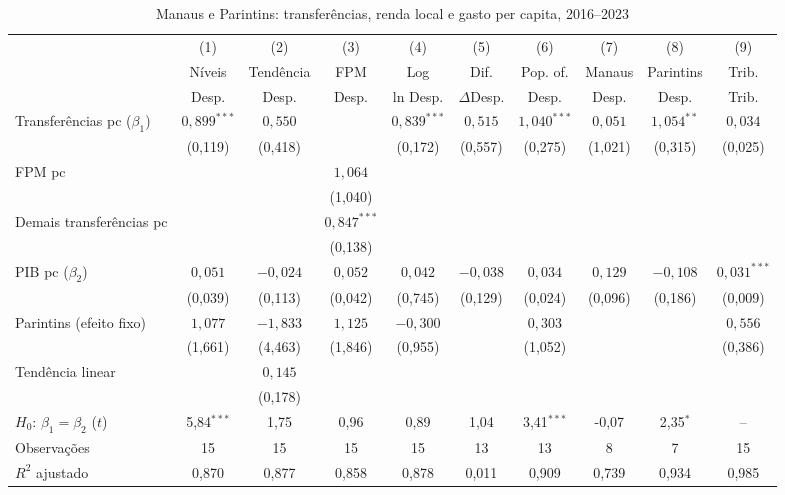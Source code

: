 \begin{table}[htbp]
\centering
\caption{Manaus e Parintins: transferências, renda local e gasto per capita, 2016--2023}
\label{tab:reg}
\scriptsize
\setlength{\tabcolsep}{2.6pt}
\begin{tabular}{lccccccccc}
\toprule
 & (1) & (2) & (3) & (4) & (5) & (6) & (7) & (8) & (9)\\
 & Níveis & Tendência & FPM & Log & Dif. & Pop. of. & Manaus & Parintins & Trib.\\
 & Desp. & Desp. & Desp. & ln Desp. & $\Delta$Desp. & Desp. & Desp. & Desp. & Trib.\\
\midrule
Transferências pc ($\beta_1$) & $0,899^{***}$ & $0,550$ &  & $0,839^{***}$ & $0,515$ & $1,040^{***}$ & $0,051$ & $1,054^{**}$ & $0,034$\\
 & (0,119) & (0,418) &  & (0,172) & (0,557) & (0,275) & (1,021) & (0,315) & (0,025)\\[1pt]
FPM pc &  &  & $1,064$ &  &  &  &  &  & \\
 &  &  & (1,040) &  &  &  &  &  & \\[1pt]
Demais transferências pc &  &  & $0,847^{***}$ &  &  &  &  &  & \\
 &  &  & (0,138) &  &  &  &  &  & \\[1pt]
PIB pc ($\beta_2$) & $0,051$ & $-0,024$ & $0,052$ & $0,042$ & $-0,038$ & $0,034$ & $0,129$ & $-0,108$ & $0,031^{***}$\\
 & (0,039) & (0,113) & (0,042) & (0,745) & (0,129) & (0,024) & (0,096) & (0,186) & (0,009)\\[1pt]
Parintins (efeito fixo) & $1,077$ & $-1,833$ & $1,125$ & $-0,300$ &  & $0,303$ &  &  & $0,556$\\
 & (1,661) & (4,463) & (1,846) & (0,955) &  & (1,052) &  &  & (0,386)\\[1pt]
Tendência linear &  & $0,145$ &  &  &  &  &  &  & \\
 &  & (0,178) &  &  &  &  &  &  & \\[1pt]
\midrule
$H_0$: $\beta_1=\beta_2$ ($t$) & 5,84$^{***}$ & 1,75 & 0,96 & 0,89 & 1,04 & 3,41$^{***}$ & -0,07 & 2,35$^{*}$ & --\\
Observações & 15 & 15 & 15 & 15 & 13 & 13 & 8 & 7 & 15\\
$R^2$ ajustado & 0,870 & 0,877 & 0,858 & 0,878 & 0,011 & 0,909 & 0,739 & 0,934 & 0,985\\
\bottomrule
\end{tabular}
\par\smallskip
\begin{minipage}{0.98\textwidth}\scriptsize

\end{minipage}
\end{table}
